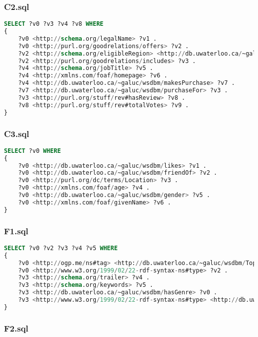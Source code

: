 \documentclass[titlepage, a4paper, 12pt] {article}
\begin{document}
\subsubsection{C2.sql}

\begin{lstlisting}[language=SQL] 
SELECT ?v0 ?v3 ?v4 ?v8 WHERE 
{
	?v0 <http://schema.org/legalName> ?v1 .
	?v0 <http://purl.org/goodrelations/offers> ?v2 .
	?v2 <http://schema.org/eligibleRegion> <http://db.uwaterloo.ca/~galuc/wsdbm/Country5> .
	?v2 <http://purl.org/goodrelations/includes> ?v3 .
	?v4 <http://schema.org/jobTitle> ?v5 .
	?v4 <http://xmlns.com/foaf/homepage> ?v6 .
	?v4 <http://db.uwaterloo.ca/~galuc/wsdbm/makesPurchase> ?v7 .
	?v7 <http://db.uwaterloo.ca/~galuc/wsdbm/purchaseFor> ?v3 .
	?v3 <http://purl.org/stuff/rev#hasReview> ?v8 .
	?v8 <http://purl.org/stuff/rev#totalVotes> ?v9 .
}
\end{lstlisting}

\subsubsection{C3.sql}

\begin{lstlisting}[language=SQL] 
SELECT ?v0 WHERE 
{
	?v0 <http://db.uwaterloo.ca/~galuc/wsdbm/likes> ?v1 .
	?v0 <http://db.uwaterloo.ca/~galuc/wsdbm/friendOf> ?v2 .
	?v0 <http://purl.org/dc/terms/Location> ?v3 .
	?v0 <http://xmlns.com/foaf/age> ?v4 .
	?v0 <http://db.uwaterloo.ca/~galuc/wsdbm/gender> ?v5 .
	?v0 <http://xmlns.com/foaf/givenName> ?v6 .
}
\end{lstlisting}

\subsubsection{F1.sql}

\begin{lstlisting}[language=SQL] 
SELECT ?v0 ?v2 ?v3 ?v4 ?v5 WHERE 
{
	?v0 <http://ogp.me/ns#tag> <http://db.uwaterloo.ca/~galuc/wsdbm/Topic103> .
	?v0 <http://www.w3.org/1999/02/22-rdf-syntax-ns#type> ?v2 .
	?v3 <http://schema.org/trailer> ?v4 .
	?v3 <http://schema.org/keywords> ?v5 .
	?v3 <http://db.uwaterloo.ca/~galuc/wsdbm/hasGenre> ?v0 .
	?v3 <http://www.w3.org/1999/02/22-rdf-syntax-ns#type> <http://db.uwaterloo.ca/~galuc/wsdbm/ProductCategory2> .
}
\end{lstlisting}

\subsubsection{F2.sql}
\end{document}
